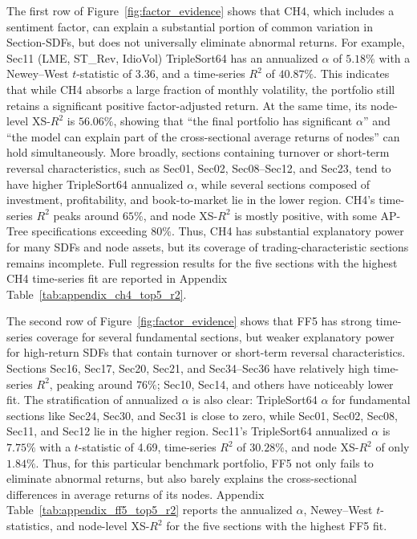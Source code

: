 \documentclass[12pt]{article}
\begin{document}
The first row of Figure~\ref{fig:factor_evidence} shows that CH4, which includes a sentiment factor, can explain a substantial portion of common variation in Section-SDFs, but does not universally eliminate abnormal returns. For example, Sec11 (LME, ST\_Rev, IdioVol) TripleSort64 has an annualized \(\alpha\) of \(5.18\%\) with a Newey–West \(t\)-statistic of 3.36, and a time-series \(R^2\) of \(40.87\%\). This indicates that while CH4 absorbs a large fraction of monthly volatility, the portfolio still retains a significant positive factor-adjusted return. At the same time, its node-level XS-\(R^2\) is \(56.06\%\), showing that ``the final portfolio has significant \(\alpha\)'' and ``the model can explain part of the cross-sectional average returns of nodes'' can hold simultaneously. More broadly, sections containing turnover or short-term reversal characteristics, such as Sec01, Sec02, Sec08–Sec12, and Sec23, tend to have higher TripleSort64 annualized \(\alpha\), while several sections composed of investment, profitability, and book-to-market lie in the lower region. CH4's time-series \(R^2\) peaks around \(65\%\), and node XS-\(R^2\) is mostly positive, with some AP-Tree specifications exceeding \(80\%\). Thus, CH4 has substantial explanatory power for many SDFs and node assets, but its coverage of trading-characteristic sections remains incomplete. Full regression results for the five sections with the highest CH4 time-series fit are reported in Appendix Table~\ref{tab:appendix_ch4_top5_r2}.

The second row of Figure~\ref{fig:factor_evidence} shows that FF5 has strong time-series coverage for several fundamental sections, but weaker explanatory power for high-return SDFs that contain turnover or short-term reversal characteristics. Sections Sec16, Sec17, Sec20, Sec21, and Sec34–Sec36 have relatively high time-series \(R^2\), peaking around \(76\%\); Sec10, Sec14, and others have noticeably lower fit. The stratification of annualized \(\alpha\) is also clear: TripleSort64 \(\alpha\) for fundamental sections like Sec24, Sec30, and Sec31 is close to zero, while Sec01, Sec02, Sec08, Sec11, and Sec12 lie in the higher region. Sec11's TripleSort64 annualized \(\alpha\) is \(7.75\%\) with a \(t\)-statistic of 4.69, time-series \(R^2\) of \(30.28\%\), and node XS-\(R^2\) of only \(1.84\%\). Thus, for this particular benchmark portfolio, FF5 not only fails to eliminate abnormal returns, but also barely explains the cross-sectional differences in average returns of its nodes. Appendix Table~\ref{tab:appendix_ff5_top5_r2} reports the annualized \(\alpha\), Newey–West \(t\)-statistics, and node-level XS-\(R^2\) for the five sections with the highest FF5 fit.
\end{document}

